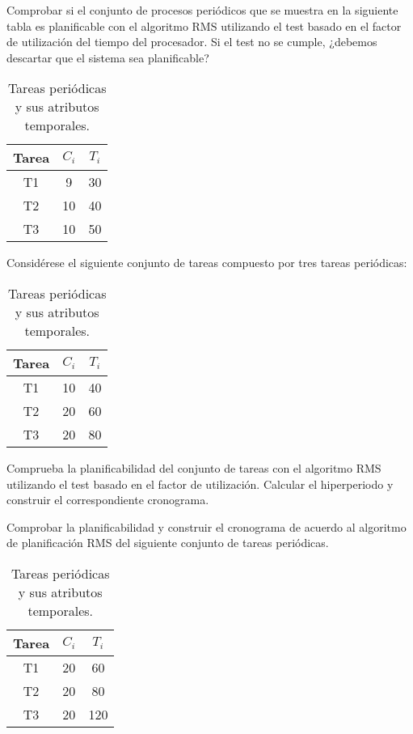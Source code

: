 \begin{ejercicio}\label{ej:rel4_3}
    Comprobar si el conjunto de procesos periódicos que se muestra en la siguiente tabla es planificable con el algoritmo RMS utilizando el test basado en el factor de utilización del tiempo del procesador. Si el test no se cumple, ¿debemos descartar que el sistema sea planificable?    
    \begin{table}[H]
    \centering
    \begin{tabular}{|c|c|c|}
        \hline
        Tarea & $C_i$ & $T_i$ \\
        \hline
        T1 & 9 & 30 \\
        \hline
        T2 & 10 & 40 \\
        \hline
        T3 & 10 & 50 \\
        \hline
    \end{tabular}
    \caption{Tareas periódicas y sus atributos temporales.}
    \label{tab:4_3}
    \end{table}
\end{ejercicio}

\begin{ejercicio}\label{ej:rel4_4}
    Considérese el siguiente conjunto de tareas compuesto por tres tareas periódicas:
    \begin{table}[H]
    \centering
    \begin{tabular}{|c|c|c|}
        \hline
        Tarea & $C_i$ & $T_i$ \\
        \hline
        T1 & 10 & 40 \\
        \hline
        T2 & 20 & 60 \\
        \hline
        T3 & 20 & 80 \\
        \hline
    \end{tabular}
    \caption{Tareas periódicas y sus atributos temporales.}
    \label{tab:4_4}
    \end{table}
    Comprueba la planificabilidad del conjunto de tareas con el algoritmo RMS utilizando el test basado en el factor de utilización. Calcular el hiperperiodo y construir el correspondiente cronograma.
\end{ejercicio}

\begin{ejercicio}\label{ej:rel4_5}
    Comprobar la planificabilidad y construir el cronograma de acuerdo al algoritmo de planificación RMS del siguiente conjunto de tareas periódicas.
    \begin{table}[H]
    \centering
    \begin{tabular}{|c|c|c|}
        \hline
        Tarea & $C_i$ & $T_i$ \\
        \hline
        T1 & 20 & 60 \\
        \hline
        T2 & 20 & 80 \\
        \hline
        T3 & 20 & 120 \\
        \hline
    \end{tabular}
    \caption{Tareas periódicas y sus atributos temporales.}
    \label{tab:4_5}
    \end{table}
\end{ejercicio}

